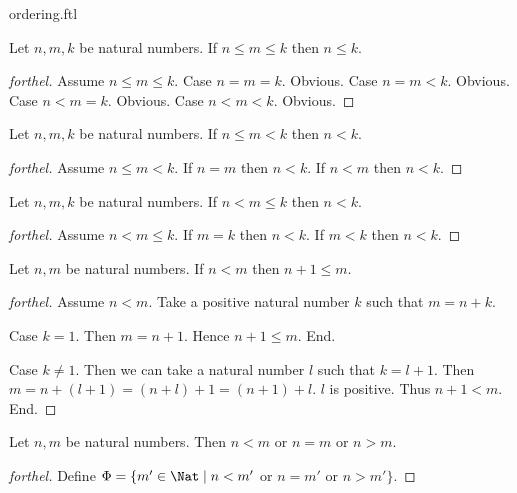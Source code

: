 \documentclass{naproche-library}
\begin{document}
\begin{smodule}{ordering.ftl}
  \begin{proposition}[forthel,id=ARITHMETIC_04_5480385953660928,printid]
    Let $n, m, k$ be natural numbers.
    If $n \leq m \leq k$ then $n \leq k$.
  \end{proposition}
  \begin{proof}[forthel]
    Assume $n \leq m \leq k$.
    Case $n = m = k$. Obvious.
    Case $n = m < k$. Obvious.
    Case $n < m = k$. Obvious.
    Case $n < m < k$. Obvious.
  \end{proof}

  \begin{proposition}[forthel,id=ARITHMETIC_04_5098403656630272,printid]
    Let $n, m, k$ be natural numbers.
    If $n \leq m < k$ then $n < k$.
  \end{proposition}
  \begin{proof}[forthel]
    Assume $n \leq m < k$.
    If $n = m$ then $n < k$.
    If $n < m$ then $n < k$.
  \end{proof}

  \begin{proposition}[forthel,id=ARITHMETIC_04_4809599527944192,printid]
    Let $n, m, k$ be natural numbers.
    If $n < m \leq k$ then $n < k$.
  \end{proposition}
  \begin{proof}[forthel]
    Assume $n < m \leq k$.
    If $m = k$ then $n < k$.
    If $m < k$ then $n < k$.
  \end{proof}

  \begin{proposition}[forthel,id=ARITHMETIC_04_8584998051381248,printid]
    Let $n, m$ be natural numbers.
    If $n < m$ then $n + 1 \leq m$.
  \end{proposition}
  \begin{proof}[forthel]
    Assume $n < m$.
    Take a positive natural number $k$ such that $m = n + k$.

    Case $k = 1$.
      Then $m = n + 1$.
      Hence $n + 1 \leq m$.
    End.

    Case $k \neq 1$.
      Then we can take a natural number $l$ such that $k = l + 1$.
      Then $m
        = n + (l + 1)
        = (n + l) + 1
        = (n + 1) + l$.
      $l$ is positive.
      Thus $n + 1 < m$.
    End.
  \end{proof}

  \begin{proposition}[forthel,id=ARITHMETIC_04_8201937860165632,printid]
    Let $n, m$ be natural numbers.
    Then $n < m$ or $n = m$ or $n > m$.
  \end{proposition}
  \begin{proof}[forthel]
    Define $\Phi = \{ m' \in \Nat \mid n < m'$ or $n = m'$ or $n > m' \}$.


\end{proof}
\end{smodule}
\end{document}
